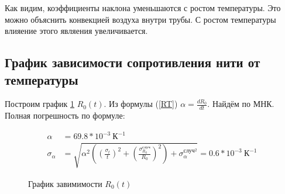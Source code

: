 \documentclass[a4paper, 12pt]{article}
\begin{document}
            Как видим, коэффициенты наклона уменьшаются с ростом температуры. Это можно объяснить конвекцией воздуха внутри трубы. С ростом температуры влияение этого являения увеличивается.

        \subsection{График зависимости сопротивления нити от температуры}

            Построим график \ref{RT_graph} $R_0(t)$. Из формулы (\ref{RT}) $\alpha = \frac{dR_0}{dt}$. Найдём по МНК. Полная погрешность по формуле:

            \begin{align*}
                \alpha &= 69.8 * 10^{-3}~К^{-1}\\
                \sigma_{\alpha} &= \sqrt{ \alpha^2 \left( \left( \frac{\sigma_t}{t} \right)^2 + \left( \frac{\sigma_{R_0}^{случ}}{R_0} \right)^2 \right) + \sigma_{\alpha}^{случ^2} } = 0.6 * 10^{-3}~К^{-1}
            \end{align*}

            \begin{figure}[ht]
                \caption{График завимимости $R_0(t)$}
                \label{RT_graph}
            \end{figure}
\end{document}
